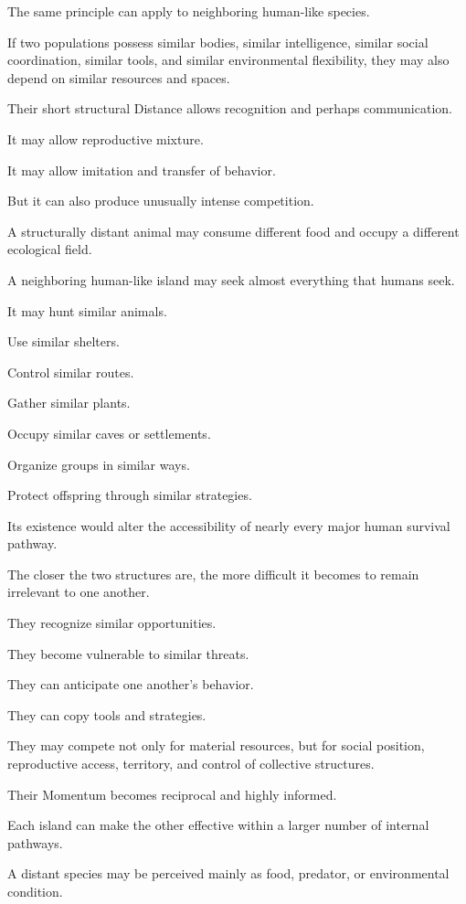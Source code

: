 The same principle can apply to neighboring human-like species.

If two populations possess similar bodies, similar intelligence, similar social coordination, similar tools, and similar environmental flexibility, they may also depend on similar resources and spaces.

Their short structural Distance allows recognition and perhaps communication.

It may allow reproductive mixture.

It may allow imitation and transfer of behavior.

But it can also produce unusually intense competition.

A structurally distant animal may consume different food and occupy a different ecological field.

A neighboring human-like island may seek almost everything that humans seek.

It may hunt similar animals.

Use similar shelters.

Control similar routes.

Gather similar plants.

Occupy similar caves or settlements.

Organize groups in similar ways.

Protect offspring through similar strategies.

Its existence would alter the accessibility of nearly every major human survival pathway.

The closer the two structures are, the more difficult it becomes to remain irrelevant to one another.

They recognize similar opportunities.

They become vulnerable to similar threats.

They can anticipate one another’s behavior.

They can copy tools and strategies.

They may compete not only for material resources, but for social position, reproductive access, territory, and control of collective structures.

Their Momentum becomes reciprocal and highly informed.

Each island can make the other effective within a larger number of internal pathways.

A distant species may be perceived mainly as food, predator, or environmental condition.

